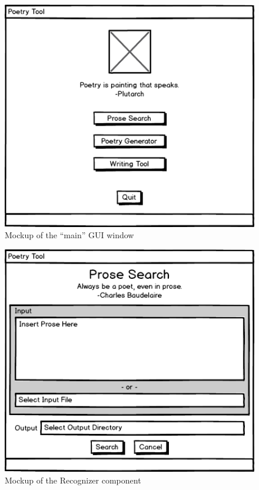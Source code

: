 \documentclass[10pt, letter,twocolumn]{IEEEtran}
\begin{document}
\begin{figure}[ht]
  \centering
    \includegraphics[scale=0.5]{Images/Main}
    \caption{Mockup of the ``main'' GUI window}
  \label{gui1}
\end{figure}

\begin{figure}[ht]
  \centering
    \includegraphics[scale=0.5]{Images/recognize}
    \caption{Mockup of the Recognizer component}
  \label{gui2}
\end{figure}
\end{document}
